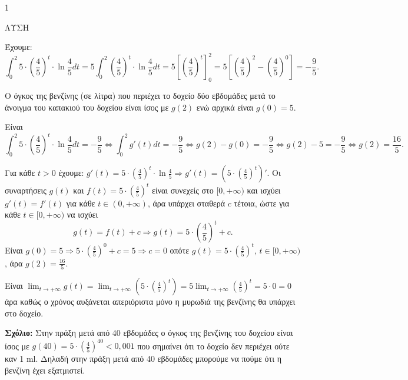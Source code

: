 \begin{ylh}{1}
    \item [Ύλη από εικόνα]
\end{ylh}
ΛΥΣΗ
\begin{alist}
    \item [α)] Έχουμε:
    \[
        \int_0^2 5 \cdot \left(\frac{4}{5}\right)^t \cdot \ln\frac{4}{5} dt = 5 \int_0^2 \left(\frac{4}{5}\right)^t \cdot \ln\frac{4}{5} dt = 5 \left[ \left(\frac{4}{5}\right)^t \right]_0^2 = 5 \left[ \left(\frac{4}{5}\right)^2 - \left(\frac{4}{5}\right)^0 \right] = -\frac{9}{5}.
    \]
    \item [β)] Ο όγκος της βενζίνης (σε λίτρα) που περιέχει το δοχείο δύο εβδομάδες μετά το άνοιγμα του καπακιού του δοχείου είναι ίσος με $g(2)$ ενώ αρχικά είναι $g(0)=5$.
    
    Είναι
    \[
        \int_0^2 5 \cdot \left(\frac{4}{5}\right)^t \cdot \ln\frac{4}{5} dt = -\frac{9}{5} \Leftrightarrow \int_0^2 g'(t)dt = -\frac{9}{5} \Leftrightarrow g(2)-g(0) = -\frac{9}{5} \Leftrightarrow g(2)-5 = -\frac{9}{5} \Leftrightarrow g(2) = \frac{16}{5}.
    \]
    
    Για κάθε $t>0$ έχουμε: $g'(t) = 5 \cdot \left(\frac{4}{5}\right)^t \cdot \ln\frac{4}{5} \Rightarrow g'(t) = \left( 5 \cdot \left(\frac{4}{5}\right)^t \right)'$.
    Οι συναρτήσεις $g(t)$ και $f(t) = 5 \cdot \left(\frac{4}{5}\right)^t$ είναι συνεχείς στο $[0,+\infty)$ και ισχύει $g'(t) = f'(t)$ για κάθε $t \in (0,+\infty)$, άρα υπάρχει σταθερά $c$ τέτοια, ώστε για κάθε $t \in [0,+\infty)$ να ισχύει
    \[
        g(t) = f(t)+c \Rightarrow g(t) = 5 \cdot \left(\frac{4}{5}\right)^t + c.
    \]
    Είναι $g(0)=5 \Rightarrow 5 \cdot \left(\frac{4}{5}\right)^0 + c = 5 \Rightarrow c=0$ οπότε $g(t) = 5 \cdot \left(\frac{4}{5}\right)^t$, $t \in [0,+\infty)$, άρα $g(2) = \frac{16}{5}$.

    \item [γ)] Είναι $\lim_{t\to+\infty} g(t) = \lim_{t\to+\infty} \left( 5 \cdot \left(\frac{4}{5}\right)^t \right) = 5 \lim_{t\to+\infty} \left(\frac{4}{5}\right)^t = 5 \cdot 0 = 0$ άρα καθώς ο χρόνος αυξάνεται απεριόριστα μόνο η μυρωδιά της βενζίνης θα υπάρχει στο δοχείο.
\end{alist}

\noindent \textbf{Σχόλιο:} Στην πράξη μετά από 40 εβδομάδες ο όγκος της βενζίνης του δοχείου είναι ίσος με
$g(40) = 5 \cdot \left(\frac{4}{5}\right)^{40} < 0,001$ που σημαίνει ότι το δοχείο δεν περιέχει ούτε καν 1 ml. Δηλαδή στην πράξη μετά από 40 εβδομάδες μπορούμε να πούμε ότι η βενζίνη έχει εξατμιστεί.